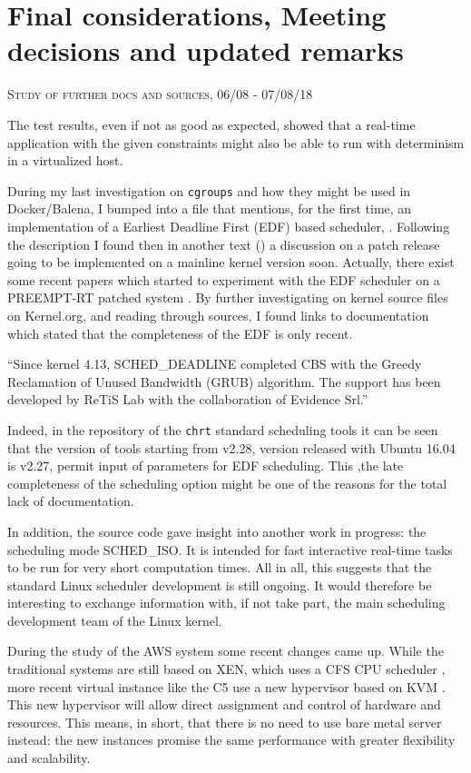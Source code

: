 \documentclass[]{scrartcl}
\begin{document}
\section{Final considerations, Meeting decisions and updated remarks}

{\small\textsc{Study of further docs and sources, 06/08 - 07/08/18} \bigskip}

The test results, even if not as good as expected, showed that a real-time application with the given constraints might also be able to run with determinism in a virtualized host.
 
During my last investigation on \texttt{cgroups} and how they might be used in Docker/Balena, I bumped into a file that mentions, for the first time, an implementation of a Earliest Deadline First (EDF) based scheduler, \cite{kernel01}.
Following the description I found then in another text
(\cite{kernel02}) a discussion on a patch release going to be implemented on a mainline kernel version soon. Actually, there exist some recent papers which started to experiment with the EDF scheduler on a PREEMPT-RT patched system \cite{Buelnaetal2017}.
By further investigating on kernel source files on Kernel.org, and reading through sources, I found links to documentation \cite{wiki01} which stated that the completeness of the EDF is only recent.
\bigskip

``Since kernel 4.13, SCHED\_DEADLINE completed CBS with the Greedy Reclamation of Unused Bandwidth (GRUB) algorithm. The support has been developed by ReTiS Lab with the collaboration of Evidence Srl.''
\bigskip

Indeed, in the repository of the \texttt{chrt} standard scheduling tools \cite{schtools01} it can be seen that the version of tools starting from v2.28, version released with Ubuntu 16.04 is v2.27, permit input of  parameters for EDF scheduling.
This ,the late completeness of the scheduling option might be one of the reasons for the total lack of documentation.

In addition, the source code gave insight into another work in progress: the scheduling mode SCHED\_ISO. It is intended for fast interactive real-time tasks to be run for very short computation times. All in all, this suggests that the standard Linux scheduler  development is still ongoing.
It would therefore be interesting to exchange information with, if not take part, the main scheduling development team of the Linux kernel.

During the study of the AWS system some recent changes came up. While the traditional systems are still based on XEN, which uses a CFS CPU scheduler \cite{xen01}, more recent virtual instance like the C5 use a new hypervisor based on KVM \cite{amazon01}.
This new hypervisor will allow direct assignment and control of hardware and resources.
This means, in short, that there is no need to use bare metal server instead: the new instances promise the same performance with greater flexibility and scalability.
\end{document}
